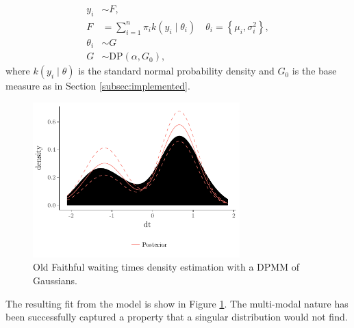 \documentclass[nojss]{jss}
\begin{document}
\begin{align*}
y_i & \sim F, \\
F & = \sum _{i=1} ^n \pi _i k(y_i \mid \theta _i) \quad \theta _i = \left\lbrace \mu _i , \sigma ^2 _i \right\rbrace , \\
\theta _i & \sim G \\
G & \sim \text{DP}(\alpha , G_0),
\end{align*}
where $k(y _i \mid \theta )$ is the standard normal probability density and $G_0$ is the base measure as in Section \ref{subsec:implemented}.

\begin{Schunk}
\end{Schunk}

\begin{figure}[tb]
\centering
	\includegraphics[height=60mm, width=80mm]{img/old_faithful_plot.pdf}
	\caption{Old Faithful waiting times density estimation with a DPMM of Gaussians. }
	\label{fig:oldfaithful}
\end{figure}
The resulting fit from the model is show in Figure \ref{fig:oldfaithful}. The multi-modal nature has been successfully captured a property that a singular distribution would not find.

\end{document}
